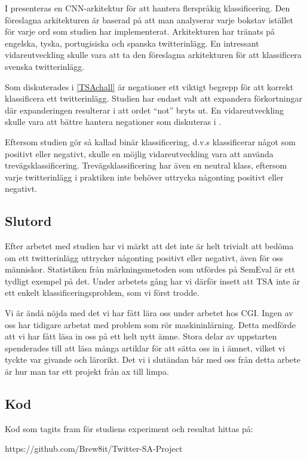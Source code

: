\documentclass{kaumasters} %
\begin{document}
I \cite{slut:001} presenteras en CNN-arkitektur för att hantera flerspråkig klassificering. Den föreslagna arkitekturen är baserad på att man analyserar varje bokstav istället för varje ord som studien har implementerat. Arkitekturen har tränats på engelska, tyska, portugisiska och spanska twitterinlägg. En intressant vidareutveckling skulle vara att ta den föreslagna arkitekturen för att klassificera svenska twitterinlägg.

Som diskuterades i \ref{TSAchall} är negationer ett viktigt begrepp för att korrekt klassificera ett twitterinlägg. Studien har endast valt att expandera förkortningar där expanderingen resulterar i att ordet “not” bryts ut. En vidareutveckling skulle vara att bättre hantera negationer som diskuteras i \cite{TSAsurvey, effrosynidis2017comparison}.

Eftersom studien gör så kallad binär klassificering, d.v.s klassificerar något som positivt eller negativt, skulle en möjlig vidareutveckling vara att använda trevägsklassificering. Trevägsklassificering har även en neutral klass, eftersom varje twitterinlägg i praktiken inte behöver uttrycka någonting positivt eller negativt. 
\section{Slutord}
Efter arbetet med studien har vi märkt att det inte är helt trivialt att bedöma om ett twitterinlägg uttrycker någonting positivt eller negativt, även för oss människor. Statistiken från märkningsmetoden som utfördes på SemEval är ett tydligt exempel på det. Under arbetets gång har vi därför  insett att TSA inte är ett enkelt klassificeringsproblem, som vi först trodde. 

Vi är ändå nöjda med det vi har fått lära oss under arbetet hos CGI. Ingen av oss har tidigare arbetat med problem som rör maskininlärning. Detta medförde att vi har fått läsa in 
oss på ett helt nytt ämne. Stora delar av uppstarten spenderades till att läsa många artiklar för att sätta oss in i ämnet, vilket vi tyckte var givande och lärorikt. Det vi i slutändan bär med oss från detta arbete är hur man tar ett projekt från ax till limpa. 

 


\begin{appendices}
\chapter{Kod}
Kod som tagits fram för studiens experiment och resultat hittas på: 

https://github.com/Brew8it/Twitter-SA-Project

\end{appendices}


\restoregeometry%
\end{document}
